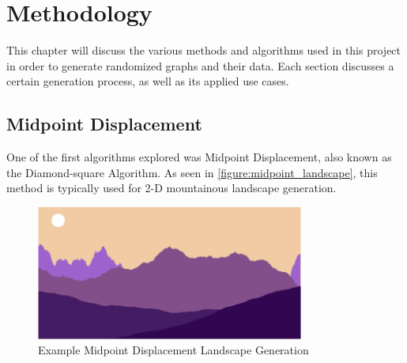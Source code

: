 \chapter{Methodology}
\label{chapter:methodology}


This chapter will discuss the various methods and algorithms used in this project in order to generate randomized graphs and their data. Each section discusses a certain generation process, as well as its applied use cases. 


\section{Midpoint Displacement}
One of the first algorithms explored was Midpoint Displacement, also known as the Diamond-square Algorithm. As seen in \autoref{figure:midpoint_landscape}, this method is typically used for 2-D mountainous landscape generation.

\hfill

\begin{figure}[hbt]
    \centering
    \includegraphics[width=250pt,keepaspectratio]{figures/body/methodology/MD_2D_landscape.PNG}
    \caption{Example Midpoint Displacement Landscape Generation \cite{acin_2016}}
    \label{figure:midpoint_landscape}
\end{figure}

